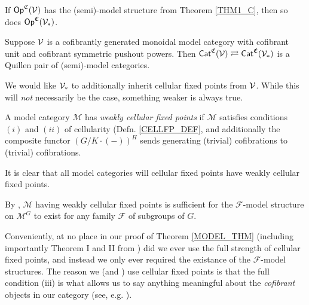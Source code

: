 \documentclass[a4paper,10pt
,draft
]{article}%
\renewcommand{\F}{\mathcal F}
\renewcommand{\1}{\eta}%
\begin{document}
\begin{corollary}
      If $\mathsf{Op}^{\mathfrak C}(\mathcal V)$ has the (semi)-model structure from Theorem \ref{THM1_C}, then so does $\Op^{\mathfrak C}(\V_{\**})$.     
\end{corollary}

\begin{lemma}
      Suppose $\mathcal V$ is a cofibrantly generated monoidal model category with cofibrant unit and cofibrant symmetric pushout powers.
      Then
      $\Cat^{\mathfrak C}(\V) \rightleftarrows \Cat^{\mathfrak C}(\V_{\**})$ is a Quillen pair of (semi)-model categories.
\end{lemma}

We would like $\V_{\**}$ to additionally inherit cellular fixed points from $\mathcal V$.
While this will \textit{not} necessarily be the case, something weaker is always true.
\begin{definition}
      A model category $\mathcal M$ has \textit{weakly cellular fixed points} if
      $\mathcal M$ satisfies conditions $(i)$ and $(ii)$ of cellularity (Defn. \ref{CELLFP_DEF},
      and additionally the composite functor $(G/K \cdot (-))^H$ sends generating (trivial) cofibrations to (trivial) cofibrations.

      It is clear that all model categories will cellular fixed points have weakly cellular fixed points.
\end{definition}

\begin{remark}
      By \cite[Rem. 2.8]{Ste16}, $\mathcal M$ having weakly cellular fixed points is sufficient for the 
      $\F$-model structure on $\mathcal M^G$ to exist for any family $\F$ of subgroups of $G$.
\end{remark}

\begin{remark}
      \label{WEAKCELL_REM}
      Conveniently, at no place in our proof of Theorem \ref{MODEL_THM} (including importantly Theorem I and II from \cite{BP_geo})
      did we ever use the full strength of cellular fixed points,
      and instead we only ever required the existance of the $\F$-model structures.
      The reason we (and \cite{Ste16}) use cellular fixed points is that the full condition (iii) is what allows us to say anything meaningful about the \textit{cofibrant} objects in our category (see, e.g. \cite[Prop. 6.56 and Lemma 6.59]{BP_geo}).
\end{remark}
\end{document}
